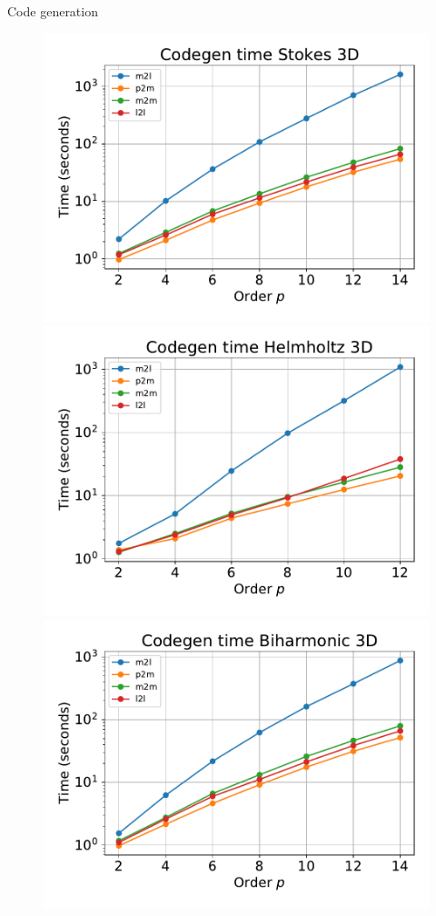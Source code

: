\documentclass[10pt,usenames,dvipsnames]{beamer}
\begin{document}
\begin{frame}[fragile]{Code generation}
\begin{figure}
\includegraphics[scale=0.3]{figures/codegen-time-stokes-3d.pdf}
\includegraphics[scale=0.3]{figures/codegen-time-helmholtz-3d.pdf}
\includegraphics[scale=0.3]{figures/codegen-time-biharmonic-3d.pdf}

\end{figure}
\end{frame}
\end{document}
